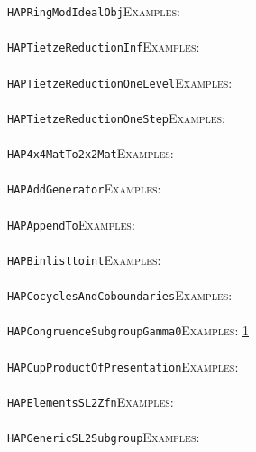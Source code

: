 \documentclass[a4paper,11pt]{report}
\begin{document}
{{ \texttt{HAPRingModIdealObj}{\nobreakspace}{\nobreakspace}{\nobreakspace}{\nobreakspace}\textsc{Examples:} \\
 \\
 \texttt{HAPTietzeReduction{\textunderscore}Inf}{\nobreakspace}{\nobreakspace}{\nobreakspace}{\nobreakspace}\textsc{Examples:} \\
 \\
 \texttt{HAPTietzeReduction{\textunderscore}OneLevel}{\nobreakspace}{\nobreakspace}{\nobreakspace}{\nobreakspace}\textsc{Examples:} \\
 \\
 \texttt{HAPTietzeReduction{\textunderscore}OneStep}{\nobreakspace}{\nobreakspace}{\nobreakspace}{\nobreakspace}\textsc{Examples:} \\
 \\
 \texttt{HAP{\textunderscore}4x4MatTo2x2Mat}{\nobreakspace}{\nobreakspace}{\nobreakspace}{\nobreakspace}\textsc{Examples:} \\
 \\
 \texttt{HAP{\textunderscore}AddGenerator}{\nobreakspace}{\nobreakspace}{\nobreakspace}{\nobreakspace}\textsc{Examples:} \\
 \\
 \texttt{HAP{\textunderscore}AppendTo}{\nobreakspace}{\nobreakspace}{\nobreakspace}{\nobreakspace}\textsc{Examples:} \\
 \\
 \texttt{HAP{\textunderscore}Binlisttoint}{\nobreakspace}{\nobreakspace}{\nobreakspace}{\nobreakspace}\textsc{Examples:} \\
 \\
 \texttt{HAP{\textunderscore}CocyclesAndCoboundaries}{\nobreakspace}{\nobreakspace}{\nobreakspace}{\nobreakspace}\textsc{Examples:} \\
 \\
 \texttt{HAP{\textunderscore}CongruenceSubgroupGamma0}{\nobreakspace}{\nobreakspace}{\nobreakspace}{\nobreakspace}\textsc{Examples:} \href{tutorial/chap10.html} {1}{\nobreakspace} \\
 \\
 \texttt{HAP{\textunderscore}CupProductOfPresentation}{\nobreakspace}{\nobreakspace}{\nobreakspace}{\nobreakspace}\textsc{Examples:} \\
 \\
 \texttt{HAP{\textunderscore}ElementsSL2Zfn}{\nobreakspace}{\nobreakspace}{\nobreakspace}{\nobreakspace}\textsc{Examples:} \\
 \\
 \texttt{HAP{\textunderscore}GenericSL2Subgroup}{\nobreakspace}{\nobreakspace}{\nobreakspace}{\nobreakspace}\textsc{Examples:} \\
}}
\end{document}
